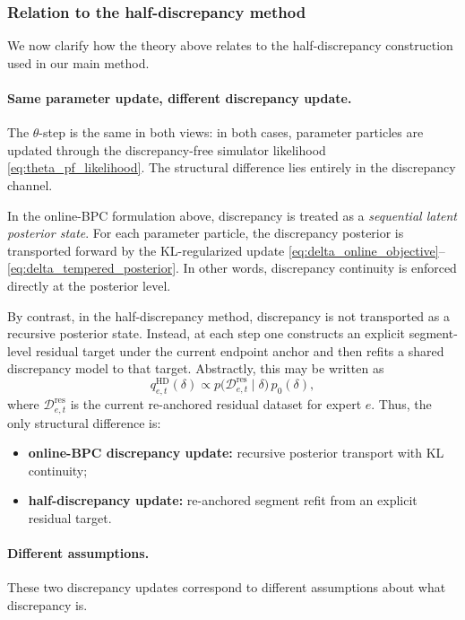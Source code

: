 \documentclass{article}
\begin{document}
\subsubsection{Relation to the half-discrepancy method}
\label{sec:relation_half_discrepancy}

We now clarify how the theory above relates to the half-discrepancy construction used in our main method.

\paragraph{Same parameter update, different discrepancy update.}
The $\theta$-step is the same in both views: in both cases, parameter particles are updated through the discrepancy-free simulator likelihood \eqref{eq:theta_pf_likelihood}. The structural difference lies entirely in the discrepancy channel.

In the online-BPC formulation above, discrepancy is treated as a \emph{sequential latent posterior state}. For each parameter particle, the discrepancy posterior is transported forward by the KL-regularized update \eqref{eq:delta_online_objective}--\eqref{eq:delta_tempered_posterior}. In other words, discrepancy continuity is enforced directly at the posterior level.

By contrast, in the half-discrepancy method, discrepancy is not transported as a recursive posterior state. Instead, at each step one constructs an explicit segment-level residual target under the current endpoint anchor and then refits a shared discrepancy model to that target. Abstractly, this may be written as
\begin{equation}
q_{e,t}^{\mathrm{HD}}(\delta)
\propto
p\!\big(\mathcal D_{e,t}^{\mathrm{res}}\mid \delta\big)\,p_0(\delta),
\label{eq:half_discrepancy_refit}
\end{equation}
where $\mathcal D_{e,t}^{\mathrm{res}}$ is the current re-anchored residual dataset for expert $e$. Thus, the only structural difference is:
\begin{itemize}[leftmargin=1.5em]
    \item \textbf{online-BPC discrepancy update:} recursive posterior transport with KL continuity;
    \item \textbf{half-discrepancy update:} re-anchored segment refit from an explicit residual target.
\end{itemize}

\paragraph{Different assumptions.}
These two discrepancy updates correspond to different assumptions about what discrepancy is.
\end{document}
